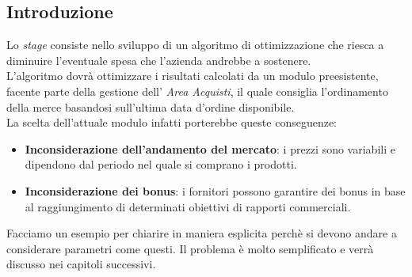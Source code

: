 \subsection{Introduzione}

\noindent Lo \textit{stage} consiste nello sviluppo di un algoritmo di ottimizzazione che riesca a diminuire l'eventuale spesa che l'azienda andrebbe
a sostenere.\\
L'algoritmo dovrà ottimizzare i risultati calcolati da un modulo preesistente, facente parte della gestione dell' \textit{Area Acquisti}, il quale
consiglia l'ordinamento della merce basandosi sull'ultima data d'ordine disponibile.\\
\noindent La scelta dell'attuale modulo infatti porterebbe queste conseguenze:
\begin{itemize}
    \item \textbf{Inconsiderazione dell'andamento del mercato}: i prezzi sono variabili e dipendono dal periodo nel quale si comprano i prodotti.
    \item \textbf{Inconsiderazione dei bonus}: i fornitori possono garantire dei bonus in base al raggiungimento di determinati obiettivi di rapporti commerciali.
\end{itemize}
\noindent Facciamo un esempio per chiarire in maniera esplicita perchè si devono andare a considerare parametri come questi. Il problema
è molto semplificato e verrà discusso nei capitoli successivi.\\

\renewcommand{\arraystretch}{1.2}

